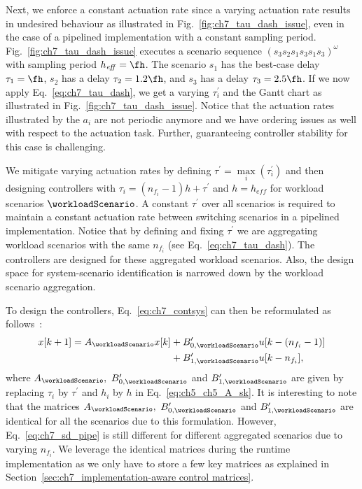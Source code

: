 Next, we enforce a constant actuation rate since a varying actuation rate results in undesired behaviour as illustrated in Fig.~\ref{fig:ch7_tau_dash_issue}, even in the case of a pipelined implementation with a constant sampling period.
Fig.~\ref{fig:ch7_tau_dash_issue} executes a scenario sequence $(s_3s_2s_1s_3s_1s_3)^\omega$ with sampling period $h_{\mathit{eff}}=\fh$. The scenario $s_1$ has the best-case delay $\tau_1=\fh$, $s_2$ has a delay $\tau_2=1.2\fh$, and $s_3$ has a delay $\tau_3=2.5\fh$. 
If we now apply Eq.~\ref{eq:ch7_tau_dash}, we get a varying $\tau_i^{\prime}$ and the Gantt chart as illustrated in Fig.~\ref{fig:ch7_tau_dash_issue}.
Notice that the actuation rates illustrated by the $a_i$
are not periodic anymore and we have ordering issues as well with respect to the actuation task. 
Further, guaranteeing controller stability for this case is challenging. 

We mitigate varying actuation rates by defining $\tau^{\prime}=\max \limits_i(\tau_i^{\prime})$ and then designing controllers with $\tau_i=(n_{f_i}-1)h+\tau^{\prime}$ and $h=h_{\mathit{eff}}$ for workload scenarios $\workloadScenario$. A constant $\tau^{\prime}$ over all scenarios is required to maintain a constant actuation rate between switching scenarios in a pipelined implementation. 
Notice that by defining and fixing $\tau^\prime$ we are aggregating workload scenarios with the same $n_{f_i}$ (see Eq.~\ref{eq:ch7_tau_dash}). The controllers are designed for these aggregated workload scenarios.
Also, the design space for system-scenario identification is narrowed down by the workload scenario aggregation.

To design the controllers, Eq.~\ref{eq:ch7_contsys} can then be reformulated as follows~\cite{ogata1995discrete}:
\begin{align}
\label{eq:ch7_sd_pipe}
x[k+1] = A_{\workloadScenario} x[k] &+ B_{0,\workloadScenario}^{\prime} u[k-(n_{f_i}-1)]\\  
                     &+ B_{1,\workloadScenario}^{\prime} u[k-n_{f_i}],\nonumber
\end{align}
where $A_{\workloadScenario},\ B_{0,\workloadScenario}^{\prime}$ and $B_{1,\workloadScenario}^{\prime}$ are given by replacing $\tau_i$ by $\tau^{\prime}$ and $h_i$ by $h$ in Eq.~\ref{eq:ch5_ch5_A_sk}.
It is interesting to note that the matrices $A_{\workloadScenario},\ B_{0,\workloadScenario}^{\prime}$ and $B_{1,\workloadScenario}^{\prime}$ are identical for all the scenarios due to this formulation.
However, Eq.~\ref{eq:ch7_sd_pipe} is still different for different aggregated scenarios due to varying $n_{f_i}$.
 We leverage the identical matrices during the runtime implementation as we only have to store a few key matrices as explained in Section~\ref{sec:ch7_implementation-aware control matrices}.
 
